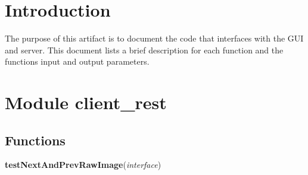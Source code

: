 %
%
%
\section{Introduction}

The purpose of this artifact is to document the code that interfaces with the GUI and server. This document lists a brief description for 
each function and the functions input and output parameters.

\section{Module client\_rest}

    \label{client_rest}


  \subsection{Functions}

    \label{client_rest:testNextAndPrevRawImage}

    \vspace{0.5ex}

\hspace{.8\funcindent}\begin{boxedminipage}{\funcwidth}

    \raggedright \textbf{testNextAndPrevRawImage}(\textit{interface})

\setlength{\parskip}{2ex}
\setlength{\parskip}{1ex}
    \end{boxedminipage}

    \label{client_rest:testNextAndPrevCroppedImage}

    \vspace{0.5ex}

